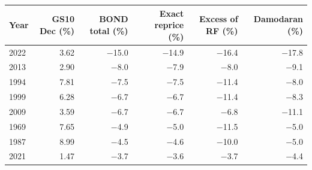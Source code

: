 \begin{tabular}{lrrrrr}
\toprule
Year & GS10 Dec (\%) & BOND total (\%) & Exact reprice (\%) & Excess of RF (\%) & Damodaran (\%) \\
\midrule
2022 & 3.62 & $-$15.0 & $-$14.9 & $-$16.4 & $-$17.8 \\
2013 & 2.90 & $-$8.0 & $-$7.9 & $-$8.0 & $-$9.1 \\
1994 & 7.81 & $-$7.5 & $-$7.5 & $-$11.4 & $-$8.0 \\
1999 & 6.28 & $-$6.7 & $-$6.7 & $-$11.4 & $-$8.3 \\
2009 & 3.59 & $-$6.7 & $-$6.7 & $-$6.8 & $-$11.1 \\
1969 & 7.65 & $-$4.9 & $-$5.0 & $-$11.5 & $-$5.0 \\
1987 & 8.99 & $-$4.5 & $-$4.6 & $-$10.0 & $-$5.0 \\
2021 & 1.47 & $-$3.7 & $-$3.6 & $-$3.7 & $-$4.4 \\
\bottomrule
\end{tabular}
